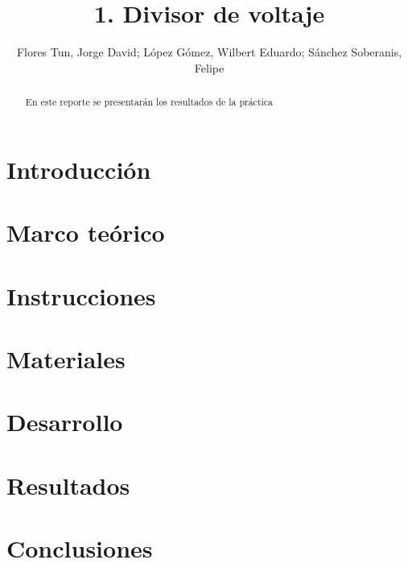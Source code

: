 \documentclass[]{article}
\title{1. Divisor de voltaje}
\author{Flores Tun, Jorge David; López Gómez, Wilbert Eduardo; Sánchez Soberanis, Felipe}
\begin{document}
\maketitle

\begin{abstract}
    En este reporte se presentarán los resultados de la práctica 
\end{abstract}

\section{Introducción}

\section{Marco teórico}

\section{Instrucciones}

\section{Materiales}

\section{Desarrollo}

\section{Resultados}

\section{Conclusiones}


\end{document}
